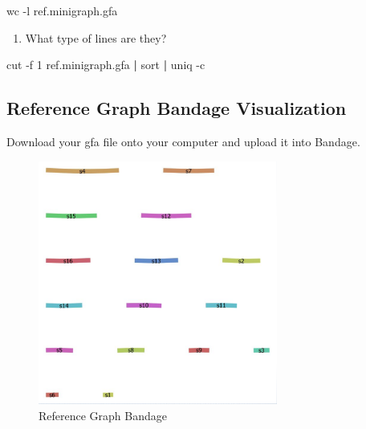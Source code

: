 \documentclass[
]{book}
\newenvironment{Shaded}{\begin{snugshade}}{\end{snugshade}}
\newcommand{\AttributeTok}[1]{\textcolor[rgb]{0.77,0.63,0.00}{#1}}
\newcommand{\FunctionTok}[1]{\textcolor[rgb]{0.00,0.00,0.00}{#1}}
\newcommand{\KeywordTok}[1]{\textcolor[rgb]{0.13,0.29,0.53}{\textbf{#1}}}
\newcommand{\NormalTok}[1]{#1}
\providecommand{\tightlist}{%
  \setlength{\itemsep}{0pt}\setlength{\parskip}{0pt}}
\begin{document}
\begin{Shaded}
\begin{Highlighting}[]
\FunctionTok{wc} \AttributeTok{{-}l}\NormalTok{ ref.minigraph.gfa}
\end{Highlighting}
\end{Shaded}

\begin{enumerate}
\def\labelenumi{\arabic{enumi}.}
\setcounter{enumi}{2}
\tightlist
\item
  What type of lines are they?
\end{enumerate}

\begin{Shaded}
\begin{Highlighting}[]
\FunctionTok{cut} \AttributeTok{{-}f}\NormalTok{ 1 ref.minigraph.gfa }\KeywordTok{|} \FunctionTok{sort} \KeywordTok{|} \FunctionTok{uniq} \AttributeTok{{-}c}
\end{Highlighting}
\end{Shaded}

\hypertarget{reference-graph-bandage-visualization}{%
\subsection*{Reference Graph Bandage Visualization}\label{reference-graph-bandage-visualization}}

Download your gfa file onto your computer and upload it into Bandage.

\begin{figure}
\centering
\includegraphics[width=0.7\textwidth,height=\textheight]{./Figures/Bandage2.png}
\caption{Reference Graph Bandage}
\end{figure}
\end{document}
